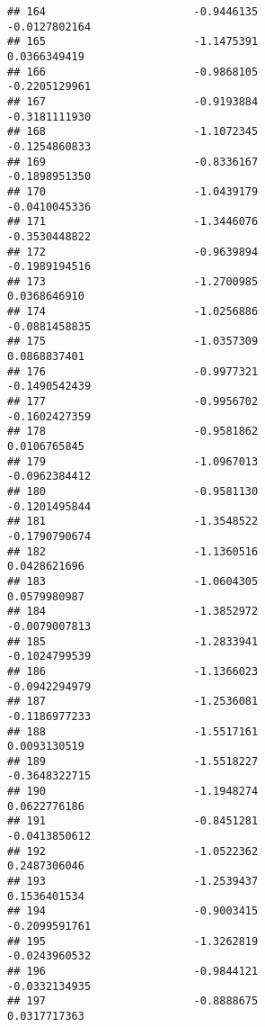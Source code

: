 \documentclass[
]{article}
\begin{document}
\begin{verbatim}
## 164                       -0.9446135                         -0.0127802164
## 165                       -1.1475391                          0.0366349419
## 166                       -0.9868105                         -0.2205129961
## 167                       -0.9193884                         -0.3181111930
## 168                       -1.1072345                         -0.1254860833
## 169                       -0.8336167                         -0.1898951350
## 170                       -1.0439179                         -0.0410045336
## 171                       -1.3446076                         -0.3530448822
## 172                       -0.9639894                         -0.1989194516
## 173                       -1.2700985                          0.0368646910
## 174                       -1.0256886                         -0.0881458835
## 175                       -1.0357309                          0.0868837401
## 176                       -0.9977321                         -0.1490542439
## 177                       -0.9956702                         -0.1602427359
## 178                       -0.9581862                          0.0106765845
## 179                       -1.0967013                         -0.0962384412
## 180                       -0.9581130                         -0.1201495844
## 181                       -1.3548522                         -0.1790790674
## 182                       -1.1360516                          0.0428621696
## 183                       -1.0604305                          0.0579980987
## 184                       -1.3852972                         -0.0079007813
## 185                       -1.2833941                         -0.1024799539
## 186                       -1.1366023                         -0.0942294979
## 187                       -1.2536081                         -0.1186977233
## 188                       -1.5517161                          0.0093130519
## 189                       -1.5518227                         -0.3648322715
## 190                       -1.1948274                          0.0622776186
## 191                       -0.8451281                         -0.0413850612
## 192                       -1.0522362                          0.2487306046
## 193                       -1.2539437                          0.1536401534
## 194                       -0.9003415                         -0.2099591761
## 195                       -1.3262819                         -0.0243960532
## 196                       -0.9844121                         -0.0332134935
## 197                       -0.8888675                          0.0317717363

\end{verbatim}
\end{document}
